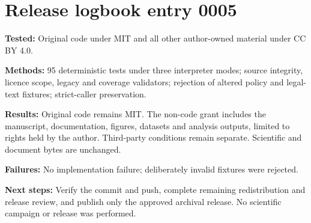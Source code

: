\section*{Release logbook entry 0005}
\textbf{Tested:} Original code under MIT and all other author-owned material under CC BY 4.0.

\textbf{Methods:} 95 deterministic tests under three interpreter modes; source integrity, licence scope, legacy and coverage validators; rejection of altered policy and legal-text fixtures; strict-caller preservation.

\textbf{Results:} Original code remains MIT. The non-code grant includes the manuscript, documentation, figures, datasets and analysis outputs, limited to rights held by the author. Third-party conditions remain separate. Scientific and document bytes are unchanged.

\textbf{Failures:} No implementation failure; deliberately invalid fixtures were rejected.

\textbf{Next steps:} Verify the commit and push, complete remaining redistribution and release review, and publish only the approved archival release. No scientific campaign or release was performed.
